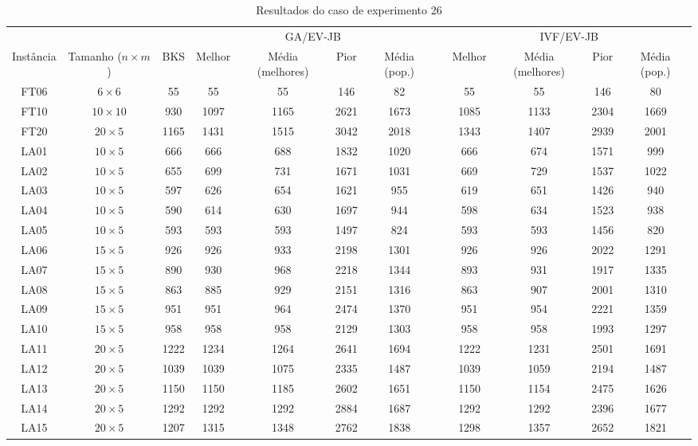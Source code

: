 \begin{sidewaystable}
\caption{Resultados do caso de experimento 26}
\centering
\label{experimento26}
\begin{tabular}{cccccccccccc}
\toprule
& & & \multicolumn{4}{c}{GA/EV-JB} & & \multicolumn{4}{c}{IVF/EV-JB} \\
\cmidrule(c){4-7}
\cmidrule(c){9-12}
Inst\^{a}ncia & Tamanho ($n \times m$) & BKS & Melhor & M\'{e}dia (melhores) & Pior & M\'{e}dia (pop.) & & Melhor & M\'{e}dia (melhores) & Pior & M\'{e}dia (pop.) \\
\midrule
FT06 & $6 \times 6$ & 55 & 55 & 55 & 146 & 82 & & 55 & 55 & 146 & 80 \\
FT10 & $10 \times 10$ & 930 & 1097 & 1165 & 2621 & 1673 & & 1085 & 1133 & 2304 & 1669 \\
FT20 & $20 \times 5$ & 1165 & 1431 & 1515 & 3042 & 2018 & & 1343 & 1407 & 2939 & 2001 \\
LA01 & $10 \times 5$ & 666 & 666 & 688 & 1832 & 1020 & & 666 & 674 & 1571 & 999 \\
LA02 & $10 \times 5$ & 655 & 699 & 731 & 1671 & 1031 & & 669 & 729 & 1537 & 1022 \\
LA03 & $10 \times 5$ & 597 & 626 & 654 & 1621 & 955 & & 619 & 651 & 1426 & 940 \\
LA04 & $10 \times 5$ & 590 & 614 & 630 & 1697 & 944 & & 598 & 634 & 1523 & 938 \\
LA05 & $10 \times 5$ & 593 & 593 & 593 & 1497 & 824 & & 593 & 593 & 1456 & 820 \\
LA06 & $15 \times 5$ & 926 & 926 & 933 & 2198 & 1301 & & 926 & 926 & 2022 & 1291 \\
LA07 & $15 \times 5$ & 890 & 930 & 968 & 2218 & 1344 & & 893 & 931 & 1917 & 1335 \\
LA08 & $15 \times 5$ & 863 & 885 & 929 & 2151 & 1316 & & 863 & 907 & 2001 & 1310 \\
LA09 & $15 \times 5$ & 951 & 951 & 964 & 2474 & 1370 & & 951 & 954 & 2221 & 1359 \\
LA10 & $15 \times 5$ & 958 & 958 & 958 & 2129 & 1303 & & 958 & 958 & 1993 & 1297 \\
LA11 & $20 \times 5$ & 1222 & 1234 & 1264 & 2641 & 1694 & & 1222 & 1231 & 2501 & 1691 \\
LA12 & $20 \times 5$ & 1039 & 1039 & 1075 & 2335 & 1487 & & 1039 & 1059 & 2194 & 1487 \\
LA13 & $20 \times 5$ & 1150 & 1150 & 1185 & 2602 & 1651 & & 1150 & 1154 & 2475 & 1626 \\
LA14 & $20 \times 5$ & 1292 & 1292 & 1292 & 2884 & 1687 & & 1292 & 1292 & 2396 & 1677 \\
LA15 & $20 \times 5$ & 1207 & 1315 & 1348 & 2762 & 1838 & & 1298 & 1357 & 2652 & 1821 \\
\bottomrule
\end{tabular}
\end{sidewaystable}
